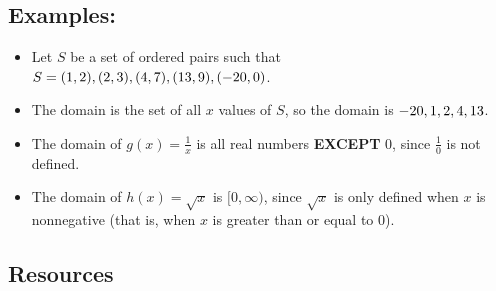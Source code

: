 \subsection{Examples:}
\label{sss:exam-bfeb}

\begin{itemize}
    \item Let $S$ be a set of ordered pairs such that $S = \\{(1, 2), (2, 3), (4, 7), (13, 9), (-20, 0)\\}$.
\end{itemize}

\begin{itemize}
    \item The domain is the set of all $x$ values of $S$, so the domain is $\\{-20, 1, 2, 4, 13\\}$.
\end{itemize}

\begin{itemize}
    \item The domain of $g(x) = \frac{1}{x}$ is all real numbers \textbf{EXCEPT} $0$, since $\frac{1}{0}$ is not defined.
\end{itemize}

\begin{itemize}
    \item The domain of $h(x) = \sqrt{x}$ is $[0, \infty)$, since $\sqrt{x}$ is only defined when $x$ is nonnegative (that is, when $x$ is greater than or equal to $0$).
\end{itemize}

\subsection{Resources}
\label{sss:reso-55b5}

